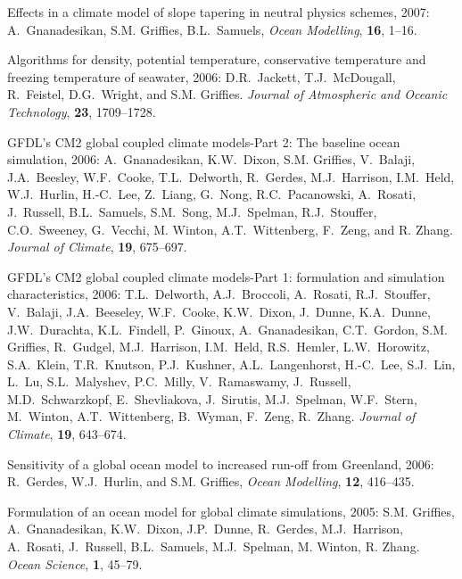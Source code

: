 \begin{etaremune}
\item Effects in a climate model of slope tapering in neutral physics
schemes, 2007: A.\ Gnanadesikan, S.M. Grif\/f\/ies, B.L.\
Samuels, {\em Ocean Modelling}, {\bf 16}, 1--16.
  
\item Algorithms for density, potential temperature, conservative
  temperature and freezing temperature of seawater, 2006: D.R.\
  Jackett, T.J.\ McDougall, R.\ Feistel, D.G.\ Wright, and S.M. Grif\/f\/ies.  {\em Journal of Atmospheric and Oceanic
    Technology}, {\bf 23}, 1709--1728.

\item GFDL's CM2 global coupled climate models-Part 2: The baseline
  ocean simulation, 2006: A.\ Gnanadesikan, K.W.\ Dixon, S.M. Grif\/f\/ies, V.\ Balaji, J.A.\ Beesley, W.F.\ Cooke, T.L.\ Delworth,
  R.\ Gerdes, M.J.\ Harrison, I.M.\ Held, W.J.\ Hurlin, H.-C.\ Lee,
  Z.\ Liang, G.\ Nong, R.C.\ Pacanowski, A.\ Rosati, J.\ Russell,
  B.L.\ Samuels, S.M.\ Song, M.J.\ Spelman, R.J.\ Stouffer, C.O.\
  Sweeney, G.\ Vecchi, M. Winton, A.T.\ Wittenberg, F.\ Zeng, and
  R. Zhang.  {\em Journal of Climate}, {\bf 19}, 675--697.

\item GFDL's CM2 global coupled climate models-Part 1: formulation and
  simulation characteristics, 2006: T.L.\ Delworth, A.J.\ Broccoli,
  A.\ Rosati, R.J.\ Stouffer, V.\ Balaji, J.A.\ Beeseley, W.F.\ Cooke,
  K.W.\ Dixon, J.\ Dunne, K.A.\ Dunne, J.W.\ Durachta, K.L.\ Findell,
  P.\ Ginoux, A.\ Gnanadesikan, C.T.\ Gordon, 
  S.M. Grif\/f\/ies,
  R.\ Gudgel, M.J.\ Harrison, I.M.\ Held, R.S.\ Hemler, L.W.\
  Horowitz, S.A.\ Klein, T.R.\ Knutson, P.J.\ Kushner, A.L.\
  Langenhorst, H.-C.\ Lee, S.J.\ Lin, L.\ Lu, S.L.\ Malyshev, P.C.\
  Milly, V.\ Ramaswamy, J.\ Russell, M.D.\ Schwarzkopf, E.\
  Shevliakova, J.\ Sirutis, M.J.\ Spelman, W.F.\ Stern, M.\ Winton,
  A.T.\ Wittenberg, B.\ Wyman, F.\ Zeng, R.\ Zhang.  {\em Journal of
    Climate}, {\bf 19}, 643--674.

\item Sensitivity of a global ocean model to increased run-off from
Greenland, 2006: R.\ Gerdes, W.J.\ Hurlin, and 
S.M. Grif\/f\/ies,
{\em Ocean Modelling}, {\bf 12}, 416--435.
  
\item Formulation of an ocean model for global climate simulations,
2005: S.M. Grif\/f\/ies, A.\ Gnanadesikan, K.W.\ Dixon, J.P.\
Dunne, R.\ Gerdes, M.J.\ Harrison, A.\ Rosati, J.\ Russell, B.L.\
Samuels, M.J.\ Spelman, M. Winton, R. Zhang. {\em Ocean Science}, {\bf
1}, 45--79.


\end{etaremune}

